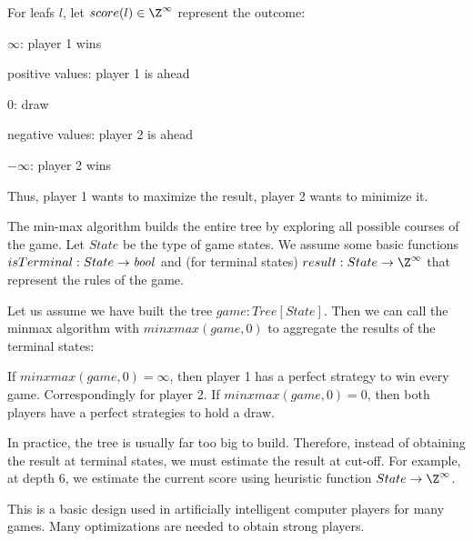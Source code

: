 For leafs $l$, let $score(l)\in\Z^\infty$ represent the outcome:
\begin{compactitem}
 \item $\infty$: player 1 wins
 \item positive values: player 1 is ahead
 \item $0$: draw
 \item negative values: player 2 is ahead
 \item $-\infty$: player 2 wins
\end{compactitem}
Thus, player 1 wants to maximize the result, player 2 wants to minimize it.

The min-max algorithm builds the entire tree by exploring all possible courses of the game.
Let $State$ be the type of game states.
We assume some basic functions $isTerminal:State\to\mathit{bool}$ and (for terminal states) $result:State\to\Z^\infty$ that represent the rules of the game.

Let us assume we have built the tree $game:Tree[State]$.
Then we can call the minmax algorithm with $minxmax(game,0)$ to aggregate the results of the terminal states:

\begin{acode}
\end{acode}

If $minxmax(game,0)=\infty$, then player 1 has a perfect strategy to win every game.
Correspondingly for player 2.
If $minxmax(game,0)=0$, then both players have a perfect strategies to hold a draw.

In practice, the tree is usually far too big to build.
Therefore, instead of obtaining the result at terminal states, we must estimate the result at cut-off.
For example, at depth $6$, we estimate the current score using heuristic function $State\to\Z^\infty$.

This is a basic design used in artificially intelligent computer players for many games.
Many optimizations are needed to obtain strong players.

